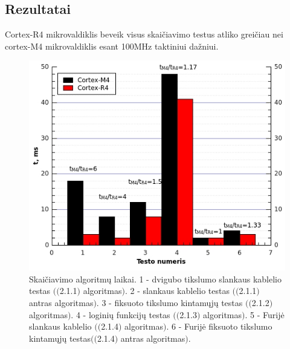 \documentclass[a4paper, 12pt]{article} %
\begin{document}
\begin{onehalfspacing}
\section{Rezultatai}
Cortex-R4 mikrovaldiklis beveik visus skai\v{c}iavimo testus atliko grei\v{c}iau nei cortex-M4 mikrovaldiklis esant 100MHz taktiniui da\v{z}niui. 
\begin{figure}[H] %
\centering %
\includegraphics[scale=0.8]{pav/testai.jpg} %
\captionsetup{labelformat=numbfirst} %
\captionsetup{labelseparator=tarpas}
\caption{Skai\v{c}iavimo algoritm\k{u} laikai. 1 - dvigubo tikslumo slankaus kablelio testas $($$($2.1.1$)$ algoritmas$)$. 2 - slankaus kablelio testas $($$($2.1.1$)$ antras algoritmas$)$. 3 - fiksuoto tikslumo kintam\k{u}j\k{u} testas $($$($2.1.2$)$ algoritmas$)$. 4 - logini\k{u} funkcij\k{u} testas $($$($2.1.3$)$ algoritmas$)$. 5 - Furij\.e slankaus kablelio $($$($2.1.4$)$ algoritmas$)$. 6 - Furij\.e fiksuoto tikslumo kintam\k{u}j\k{u} testas$($$($2.1.4$)$ antras algoritmas$)$.}
\label{vienas}
\end{figure}


\end{onehalfspacing}
\end{document}
